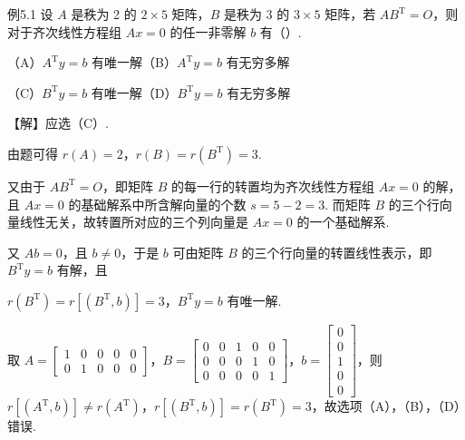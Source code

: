 \begin{fcard}{例5.1}
设 $A$ 是秩为 2 的 $2\times5$ 矩阵，$B$ 是秩为 3 的 $3\times5$ 矩阵，若 $AB^{\mathrm T}=O$，则对于齐次线性方程组 $Ax=0$ 的任一非零解 $b$ 有（\quad）.

（A）$A^{\mathrm T}y=b$ 有唯一解\qquad\qquad（B）$A^{\mathrm T}y=b$ 有无穷多解

（C）$B^{\mathrm T}y=b$ 有唯一解\qquad\qquad（D）$B^{\mathrm T}y=b$ 有无穷多解

【解】应选（C）.

由题可得 $r(A)=2$，$r(B)=r(B^{\mathrm T})=3$.


又由于 $AB^{\mathrm T}=O$，即矩阵 $B$ 的每一行的转置均为齐次线性方程组 $Ax=0$ 的解，且 $Ax=0$ 的基础解系中所含解向量的个数 $s=5-2=3$. 而矩阵 $B$ 的三个行向量线性无关，故转置所对应的三个列向量是 $Ax=0$ 的一个基础解系.

又 $Ab=0$，且 $b\ne0$，于是 $b$ 可由矩阵 $B$ 的三个行向量的转置线性表示，即 $B^{\mathrm T}y=b$ 有解，且

$r(B^{\mathrm T})=r[(B^{\mathrm T},b)]=3$，$B^{\mathrm T}y=b$ 有唯一解.

取 $A=\begin{bmatrix}1&0&0&0&0\\0&1&0&0&0\end{bmatrix}$，$B=\begin{bmatrix}0&0&1&0&0\\0&0&0&1&0\\0&0&0&0&1\end{bmatrix}$，$b=\begin{bmatrix}0\\0\\1\\0\\0\end{bmatrix}$，则 $r[(A^{\mathrm T},b)]\ne r(A^{\mathrm T})$，$r[(B^{\mathrm T},b)]=r(B^{\mathrm T})=3$，故选项（A），（B），（D）错误.
\end{fcard}


